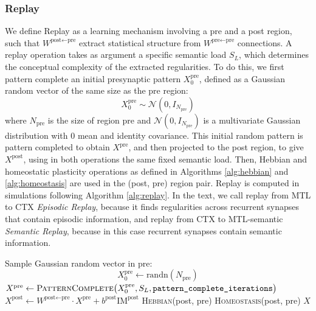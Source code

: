 \documentclass{article}
\begin{document}
\subsubsection*{Replay}
We define \textrm{Replay} as a learning mechanism involving a pre and a post region, such that $W^{\textrm{post}\leftarrow\textrm{pre}}$ extract statistical structure from $W^{\textrm{pre}\leftarrow\textrm{pre}}$ connections. A replay operation takes as argument a specific semantic load $S_L$, which determines the conceptual complexity of the extracted regularities. To do this, we first pattern complete an initial presynaptic pattern $X^\textrm{pre}_0$, defined as a Gaussian random vector of the same size as the pre region:
\begin{equation}
     X^\textrm{pre}_{0} \sim \mathcal{N}(0, I_{N_\textrm{pre}})
\end{equation}
where $N_\textrm{pre}$ is the size of region pre and $\mathcal{N}(0, I_{N_\textrm{pre}})$ is a multivariate Gaussian distribution with 0 mean and identity covariance. This initial random pattern is pattern completed to obtain $X^\textrm{pre}$, and then projected to the post region, to give $X^\textrm{post}$, using in both operations the same fixed semantic load. Then, Hebbian and homeostatic plasticity operations as defined in Algorithms \ref{alg:hebbian} and \ref{alg:homeostasis} are used in the (post, pre) region pair. Replay is computed in simulations following Algorithm \ref{alg:replay}. In the text, we call replay from MTL to CTX \textit{Episodic Replay}, because it finds regularities across recurrent synapses that contain episodic information, and replay from CTX to MTL-semantic \textit{Semantic Replay}, because in this case recurrent synapses contain semantic information.
\begin{algorithm}[h!]
\caption{Replay}\label{alg:replay}
\begin{algorithmic}[1]
    \State Sample Gaussian random vector in pre:
        \[
            X_0^\textrm{pre} \gets \text{randn}(N_\textrm{pre})
        \]
    \State $X^\textrm{pre} \gets \textsc{PatternComplete}\bigl(X^\textrm{pre}_0, S_L, \texttt{pattern\_complete\_iterations}\bigr)$
    \State $X^\textrm{post} \gets W^{\textrm{post}\leftarrow\textrm{pre}}\cdot X^\textrm{pre} + b^\textrm{post}\textrm{IM}^\textrm{post}$
    \State \textsc{Hebbian}(post, pre)
    \State \textsc{Homeostasis}(post, pre)
    \State \Return $X$
\EndFunction
\end{algorithmic}
\end{algorithm}
\end{document}
